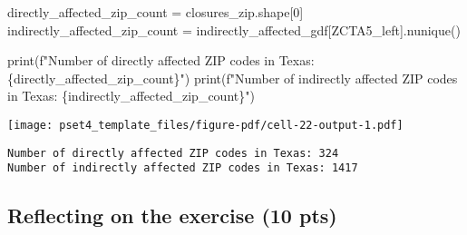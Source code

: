 \documentclass[
  letterpaper,
  DIV=11,
  numbers=noendperiod]{scrartcl}
\newenvironment{Shaded}{\begin{snugshade}}{\end{snugshade}}
\newcommand{\BuiltInTok}[1]{\textcolor[rgb]{0.00,0.23,0.31}{#1}}
\newcommand{\DecValTok}[1]{\textcolor[rgb]{0.68,0.00,0.00}{#1}}
\newcommand{\NormalTok}[1]{\textcolor[rgb]{0.00,0.23,0.31}{#1}}
\newcommand{\OperatorTok}[1]{\textcolor[rgb]{0.37,0.37,0.37}{#1}}
\newcommand{\SpecialCharTok}[1]{\textcolor[rgb]{0.37,0.37,0.37}{#1}}
\newcommand{\SpecialStringTok}[1]{\textcolor[rgb]{0.13,0.47,0.30}{#1}}
\newcommand{\StringTok}[1]{\textcolor[rgb]{0.13,0.47,0.30}{#1}}
\begin{document}
\begin{Shaded}
\begin{Highlighting}[]
\NormalTok{directly\_affected\_zip\_count }\OperatorTok{=}\NormalTok{ closures\_zip.shape[}\DecValTok{0}\NormalTok{]}
\NormalTok{indirectly\_affected\_zip\_count }\OperatorTok{=}\NormalTok{ indirectly\_affected\_gdf[}\StringTok{\textquotesingle{}ZCTA5\_left\textquotesingle{}}\NormalTok{].nunique()}

\BuiltInTok{print}\NormalTok{(}\SpecialStringTok{f"Number of directly affected ZIP codes in Texas: }\SpecialCharTok{\{}\NormalTok{directly\_affected\_zip\_count}\SpecialCharTok{\}}\SpecialStringTok{"}\NormalTok{)}
\BuiltInTok{print}\NormalTok{(}\SpecialStringTok{f"Number of indirectly affected ZIP codes in Texas: }\SpecialCharTok{\{}\NormalTok{indirectly\_affected\_zip\_count}\SpecialCharTok{\}}\SpecialStringTok{"}\NormalTok{)}
\end{Highlighting}
\end{Shaded}

\texttt{[image: pset4\_template\_files/figure-pdf/cell-22-output-1.pdf]}

\begin{verbatim}
Number of directly affected ZIP codes in Texas: 324
Number of indirectly affected ZIP codes in Texas: 1417
\end{verbatim}

\subsection{Reflecting on the exercise (10
pts)}\label{reflecting-on-the-exercise-10-pts}
\end{document}
